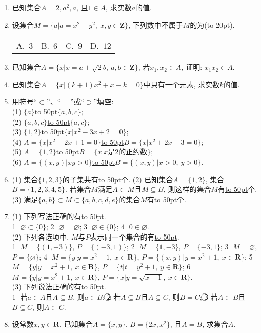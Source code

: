 \documentclass[10pt,a4paper]{article}
\newcommand{\blank}[1]{\underline{\hbox to #1pt{}}}
\newcommand{\bracket}[1]{(\hbox to #1pt{})}
\newcommand{\fourch}[4]{\par\begin{tabular}{p{.23\textwidth}p{.23\textwidth}p{.23\textwidth}p{.23\textwidth}}
A.~#1 &B.~#2& C.~#3& D.~#4
\end{tabular}}
\begin{document}
\begin{enumerate}[1.]
\item 已知集合$A={2, a^2, a}$, 且$1\in A$, 求实数$a$的值.
\item 设集合$M=\{a|a=x^2-y^2, \ x,y\in\mathbf{Z}\}$, 下列数中不属于$M$的为\bracket{20}.
\fourch{$3$}{$6$}{$9$}{$12$}
\item 已知集合$A=\{x|x=a+\sqrt 2b,\ a,b\in \mathbf{Z}\}$, 若$x_1,x_2\in A$, 证明: $x_1x_2\in A$.
\item 已知集合$A=\{x|(k+1)x^2+x-k=0\}$中只有一个元素, 求实数$k$的值.
\item 用符号``$\subset$''、``$=$''或``$\supset$''填空:\\
(1) $\{a\}$\blank{50}$\{a, b, c\}$;\\
(2) $\{a, b, c\}$\blank{50}$\{a, c\}$;\\
(3) $\{1, 2\}$\blank{50}$\{x|x^2-3x+2=0\}$;\\
(4) $A=\{x|x^2-2x+1=0\}$\blank{50}$B=\{x|x^2+2x-3=0\}$;\\
(5) $A=\{1, 2\}$\blank{50}$B=\{x|x$是$2$的正约数$\}$;\\
(6) $A=\{(x, y)|xy>0\}$\blank{50}$B=\{(x, y)|x>0, \ y>0\}$.
\item (1) 集合$\{1,2,3\}$的子集共有\blank{50}个.
(2) 已知集合$A=\{1,2\}$, 集合$B=\{1,2,3,4,5\}$. 若集合$M$满足$A\subset M$且$M\subseteq B$, 则这样的集合$M$有\blank{50}个.
(3) 满足$\{a, b\}\subset M \subset\{a, b, c, d, e\}$的集合$M$有\blank{50}个.
\item (1) 下列写法正确的有\blank{50}.\\
\textcircled{1} $\varnothing\subset\{0\}$; \textcircled{2} $\varnothing=\varnothing$; \textcircled{3} $\varnothing\in\{0\}$; \textcircled{4} $0\in\varnothing$.\\
(2) 下列各选项中, $M$与$P$表示同一个集合的有\blank{50}.\\
\textcircled{1} $M=\{(1, -3)\}$, $P=\{(-3, 1)\}$; \textcircled{2} $M=\{1, -3\}$, $P=\{-3, 1\}$; \textcircled{3} $M=\varnothing$, $P=\{\varnothing\}$; \textcircled{4} $M=\{y|y=x^2+1, \  x\in\mathbf{R}\}$, $P=\{(x, y)|y=x^2+1, \ x\in\mathbf{R}\}$; \textcircled{5} $M=\{y|y=x^2+1, \  x\in\mathbf{R}\}$, $P=\{t|t=y^2+1, \ y\in\mathbf{R}\}$; \textcircled{6} $M=\{y|y=x^2+1, \  x\in\mathbf{R}\}$, $P=\{x|y=\sqrt{x-1},\  x\in\mathbf{R}\}$.\\
(3) 下列说法正确的有\blank{50}.\\
\textcircled{1} 若$a\in A$且$A\subseteq B$, 则$a\in B$; \textcircled{2} 若$A\subseteq B$且$A\subseteq C$, 则$B=C$; \textcircled{3} 若$A\subset B$且$B\subseteq C$, 则$A\subset C$.
\item 设常数$x,y\in \mathbf{R}$, 已知集合$A=\{x, y\}$, $B=\{2x, x^2\}$, 且$A=B$, 求集合$A$.

\end{enumerate}
\end{document}
